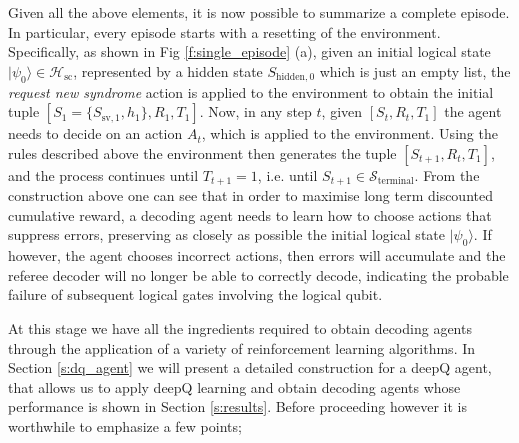 \documentclass[twocolumn,preprintnumbers,amsmath,amssymb,notitlepage,nofootinbib,longbibliography,superscriptaddress,aps,pra,10pt]{revtex4-1}
\begin{document}
	Given all the above elements, it is now possible to summarize a complete episode.
	In particular, every episode starts with a resetting of the environment.
	Specifically, as shown in Fig \ref{f:single_episode} (a), given an initial logical state $|\psi_0\rangle \in \mathcal{H}_{\mathrm{sc}}$, represented by a hidden state $S_{\mathrm{hidden},0}$ which is just an empty list, the \emph{request new syndrome} action is applied to the environment to obtain the initial tuple $[S_{1} = \{S_{\mathrm{sv},1},h_{1}\},R_{1},T_{1}]$.
	Now, in any step $t$, given $[S_{t},R_{t},T_{1}]$ the agent needs to decide on an action $A_t$, which is applied to the environment.
	Using the rules described above the environment then generates the tuple $[S_{t+1},R_{t},T_{1}]$, and the process continues until $T_{t+1} = 1$, i.e. until $S_{t+1} \in \mathcal{S}_\mathrm{terminal}$.
	From the construction above one can see that in order to maximise long term discounted cumulative reward, a decoding agent needs to learn how to choose actions that suppress errors, preserving as closely as possible the initial logical state $|\psi_0\rangle$.
	If however, the agent chooses incorrect actions, then errors will accumulate and the referee decoder will no longer be able to correctly decode, indicating the probable failure of subsequent logical gates involving the logical qubit.

	At this stage we have all the ingredients required to obtain decoding agents through the application of a variety of reinforcement learning algorithms. In Section \ref{s:dq_agent} we will present a detailed construction for a deepQ agent, that allows us to apply deepQ learning and obtain decoding agents whose performance is shown in Section \ref{s:results}. Before proceeding however it is worthwhile to emphasize a few points;
\end{document}
